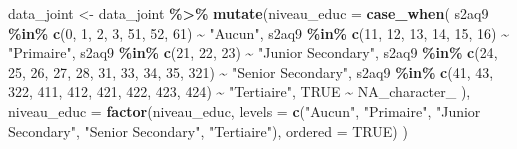\documentclass[
]{article}
\newenvironment{Shaded}{\begin{snugshade}}{\end{snugshade}}
\newcommand{\AttributeTok}[1]{\textcolor[rgb]{0.13,0.29,0.53}{#1}}
\newcommand{\ConstantTok}[1]{\textcolor[rgb]{0.56,0.35,0.01}{#1}}
\newcommand{\DecValTok}[1]{\textcolor[rgb]{0.00,0.00,0.81}{#1}}
\newcommand{\FunctionTok}[1]{\textcolor[rgb]{0.13,0.29,0.53}{\textbf{#1}}}
\newcommand{\NormalTok}[1]{#1}
\newcommand{\OtherTok}[1]{\textcolor[rgb]{0.56,0.35,0.01}{#1}}
\newcommand{\SpecialCharTok}[1]{\textcolor[rgb]{0.81,0.36,0.00}{\textbf{#1}}}
\newcommand{\StringTok}[1]{\textcolor[rgb]{0.31,0.60,0.02}{#1}}
\begin{document}
\begin{Shaded}
\begin{Highlighting}[]
\NormalTok{data\_joint }\OtherTok{\textless{}{-}}\NormalTok{ data\_joint }\SpecialCharTok{\%\textgreater{}\%}
  \FunctionTok{mutate}\NormalTok{(}\AttributeTok{niveau\_educ =} \FunctionTok{case\_when}\NormalTok{(}
\NormalTok{    s2aq9 }\SpecialCharTok{\%in\%} \FunctionTok{c}\NormalTok{(}\DecValTok{0}\NormalTok{, }\DecValTok{1}\NormalTok{, }\DecValTok{2}\NormalTok{, }\DecValTok{3}\NormalTok{, }\DecValTok{51}\NormalTok{, }\DecValTok{52}\NormalTok{, }\DecValTok{61}\NormalTok{)                    }\SpecialCharTok{\textasciitilde{}} \StringTok{"Aucun"}\NormalTok{,}
\NormalTok{    s2aq9 }\SpecialCharTok{\%in\%} \FunctionTok{c}\NormalTok{(}\DecValTok{11}\NormalTok{, }\DecValTok{12}\NormalTok{, }\DecValTok{13}\NormalTok{, }\DecValTok{14}\NormalTok{, }\DecValTok{15}\NormalTok{, }\DecValTok{16}\NormalTok{)                    }\SpecialCharTok{\textasciitilde{}} \StringTok{"Primaire"}\NormalTok{,}
\NormalTok{    s2aq9 }\SpecialCharTok{\%in\%} \FunctionTok{c}\NormalTok{(}\DecValTok{21}\NormalTok{, }\DecValTok{22}\NormalTok{, }\DecValTok{23}\NormalTok{)                                 }\SpecialCharTok{\textasciitilde{}} \StringTok{"Junior Secondary"}\NormalTok{,}
\NormalTok{    s2aq9 }\SpecialCharTok{\%in\%} \FunctionTok{c}\NormalTok{(}\DecValTok{24}\NormalTok{, }\DecValTok{25}\NormalTok{, }\DecValTok{26}\NormalTok{, }\DecValTok{27}\NormalTok{, }\DecValTok{28}\NormalTok{, }\DecValTok{31}\NormalTok{, }\DecValTok{33}\NormalTok{, }\DecValTok{34}\NormalTok{, }\DecValTok{35}\NormalTok{, }\DecValTok{321}\NormalTok{)   }\SpecialCharTok{\textasciitilde{}} \StringTok{"Senior Secondary"}\NormalTok{,}
\NormalTok{    s2aq9 }\SpecialCharTok{\%in\%} \FunctionTok{c}\NormalTok{(}\DecValTok{41}\NormalTok{, }\DecValTok{43}\NormalTok{, }\DecValTok{322}\NormalTok{, }\DecValTok{411}\NormalTok{, }\DecValTok{412}\NormalTok{, }\DecValTok{421}\NormalTok{, }\DecValTok{422}\NormalTok{, }\DecValTok{423}\NormalTok{, }\DecValTok{424}\NormalTok{)  }\SpecialCharTok{\textasciitilde{}} \StringTok{"Tertiaire"}\NormalTok{,}
    \ConstantTok{TRUE} \SpecialCharTok{\textasciitilde{}} \ConstantTok{NA\_character\_}
\NormalTok{  ),}
  \AttributeTok{niveau\_educ =} \FunctionTok{factor}\NormalTok{(niveau\_educ,}
                       \AttributeTok{levels =} \FunctionTok{c}\NormalTok{(}\StringTok{"Aucun"}\NormalTok{, }\StringTok{"Primaire"}\NormalTok{, }\StringTok{"Junior Secondary"}\NormalTok{,}
                                  \StringTok{"Senior Secondary"}\NormalTok{, }\StringTok{"Tertiaire"}\NormalTok{),}
                       \AttributeTok{ordered =} \ConstantTok{TRUE}\NormalTok{)}
\NormalTok{  )}
\end{Highlighting}
\end{Shaded}
\end{document}
